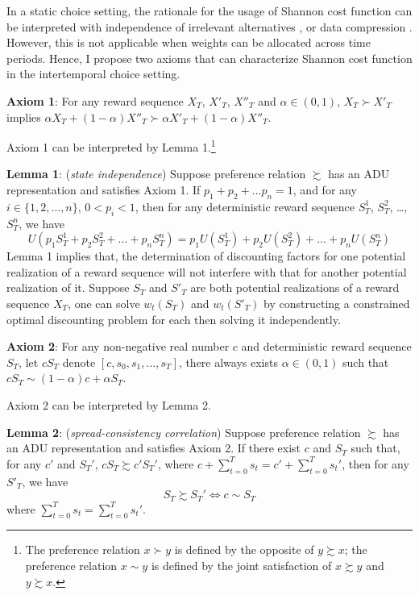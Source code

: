 \documentclass[
  12pt,
]{article}
\begin{document}
In a static choice setting, the rationale for the usage of Shannon cost
function can be interpreted with independence of irrelevant alternatives
\citep{matejka_rational_2015}, or data compression
\citep{caplin_rationally_2022}. However, this is not applicable when
weights can be allocated across time periods. Hence, I propose two
axioms that can characterize Shannon cost function in the intertemporal
choice setting.

\textbf{Axiom 1}: For any reward sequence \(X_T\), \(X'_T\), \(X''_T\)
and \(\alpha\in(0,1)\), \(X_T\succ X'_T\) implies
\(\alpha X_T+ (1-\alpha)X''_T \succ \alpha X'_T + (1-\alpha) X''_T\).

Axiom 1 can be interpreted by Lemma 1.\footnote{The preference relation
  \(x \succ y\) is defined by the opposite of \(y\succsim x\); the
  preference relation \(x\sim y\) is defined by the joint satisfaction
  of \(x\succsim y\) and \(y \succsim x\).}

\textbf{Lemma 1}: (\emph{state independence}) Suppose preference
relation \(\succsim\) has an ADU representation and satisfies Axiom 1.
If \(p_1+p_2+...p_n=1\), and for any \(i\in\{1,2,…,n\}\), \(0<p_i<1\),
then for any deterministic reward sequence \(S^1_T\), \(S^2_T\), \ldots,
\(S^n_T\), we have\[
U(p_1 S^1_T+p_2S^2_T+...+p_nS^n_T)=p_1U(S^1_T)+p_2U(S^2_T)+...+p_nU(S^n_T)
\]Lemma 1 implies that, the determination of discounting factors for one
potential realization of a reward sequence will not interfere with that
for another potential realization of it. Suppose \(S_T\) and \(S'_{T}\)
are both potential realizations of a reward sequence \(X_T\), one can
solve \(w_t(S_T)\) and \(w_t(S'_T)\) by constructing a constrained
optimal discounting problem for each then solving it independently.

\textbf{Axiom 2}: For any non-negative real number \(c\) and
deterministic reward sequence \(S_T\), let \(cS_T\) denote
\([c,s_0,s_1,...,s_T]\), there always exists \(\alpha\in(0,1)\) such
that \(cS_T\sim (1-\alpha)c+\alpha S_T\).

Axiom 2 can be interpreted by Lemma 2.

\textbf{Lemma 2}: (\emph{spread-consistency correlation}) Suppose
preference relation \(\succsim\) has an ADU representation and satisfies
Axiom 2. If there exist \(c\) and \(S_T\) such that, for any \(c'\) and
\(S_T'\), \(cS_T\succsim c'S_T'\), where
\(c+\sum_{t=0}^Ts_t=c'+\sum_{t=0}^Ts_t'\), then for any \(S'_T\), we
have \[S_T \succsim S_T' \Longleftrightarrow c\sim S_T\]where
\(\sum_{t=0}^Ts_t=\sum_{t=0}^Ts_t'\).
\end{document}
